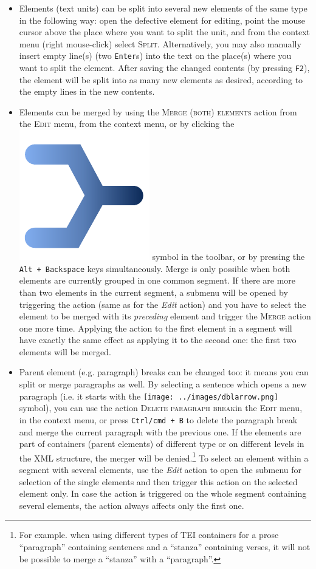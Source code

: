\documentclass[a4paper,10pt,oneside]{book}
\newcommand{\keys}[1]{\texttt{#1}}
\newcommand{\menu}[1]{\textsc{#1}}
\begin{document}
\begin{itemize}
 \item Elements (text units) can be split into several new elements of the same type in the following way: open the defective element for editing, point the mouse cursor above the place where you want to split the unit, and from the context menu (right mouse-click) select \menu{Split}. Alternatively, you may also manually insert empty line(s) (two \keys{Enter}s) into the text on the place(s) where you want to split the element. After saving the changed contents (by pressing \keys{F2}), the element will be split into as many new elements as desired, according to the empty lines in the new contents.
 \item Elements can be merged by using the \menu{Merge (both) elements} action from the \menu{Edit} menu, from the context menu, or by clicking the \includegraphics[height=2ex]{merge.pdf} symbol in the toolbar, or by pressing the \keys{Alt + Backspace} keys simultaneously. Merge is only possible when both elements are currently grouped in one common segment. If there are more than two elements in the current segment, a submenu will be opened by triggering the action (same as for the \emph{Edit} action) and you have to select the element to be merged with its \emph{preceding} element and trigger the \menu{Merge} action one more time. Applying the action to the first element in a segment will have exactly the same effect as applying it to the second one: the first two elements will be merged.
 \item Parent element (e.g. paragraph) breaks can be changed too: it means you can split or merge paragraphs as well. By selecting a sentence which opens a new paragraph (i.e. it starts with the \texttt{[image: ../images/dblarrow.png]} symbol), you can use the action \menu{Delete paragraph break}in the \menu{Edit} menu, in the context menu, or press \keys{Ctrl/cmd + B} to delete the paragraph break and merge the current paragraph with the previous one. If the elements are part of containers (parent elements) of different type or on different levels in the XML structure, the merger will be denied.\footnote{For example. when using different types of TEI containers for a prose ``paragraph'' containing sentences and a ``stanza'' containing verses, it will not be possible to merge a ``stanza'' with a ``paragraph''.} To select an element within a segment with several elements, use the \emph{Edit} action to open the submenu for selection of the single elements and then trigger this action on the selected element only. In case the action is triggered on the whole segment containing several elements, the action always affects only the first one.

\end{itemize}
\end{document}
